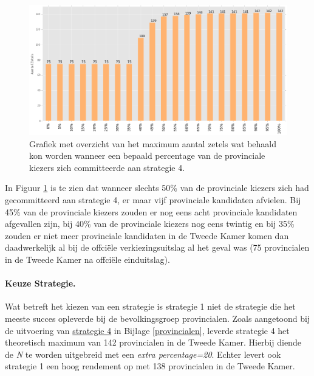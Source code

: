 \begin{figure}[H]


	\includegraphics[width=\linewidth]{percentages_van_provincialen.png}

			\caption{Grafiek met overzicht van het maximum aantal zetels wat behaald kon worden wanneer een bepaald percentage van de provinciale kiezers zich committeerde aan strategie 4.}

\label{fig:PerP}
\end{figure}

In Figuur \ref{fig:PerP} is te zien dat wanneer slechts 50\% van de provinciale kiezers zich had gecommitteerd aan strategie 4, er maar vijf provinciale kandidaten afvielen. Bij 45\% van de provinciale kiezers zouden er nog eens acht provinciale kandidaten afgevallen zijn, bij 40\% van de provinciale kiezers nog eens twintig en bij 35\% zouden er niet meer provinciale kandidaten in de Tweede Kamer komen dan daadwerkelijk al bij de offci\"{e}le verkiezingsuitslag al het geval was (75 provincialen in de Tweede Kamer na offci\"{e}le einduitslag).

\paragraph{Keuze Strategie.}
Wat betreft het kiezen van een strategie is strategie 1 niet de strategie die het meeste succes opleverde bij de bevolkingsgroep provincialen. Zoals aangetoond bij de uitvoering van \hyperref[S4P]{strategie 4} in Bijlage \ref{provincialen}, leverde strategie 4 het theoretisch maximum van 142 provincialen in de Tweede Kamer. Hierbij diende de \textit{N} te worden uitgebreid met een \textit{extra percentage=20}. Echter levert ook strategie 1 een hoog rendement op met 138 provincialen in de Tweede Kamer. 

